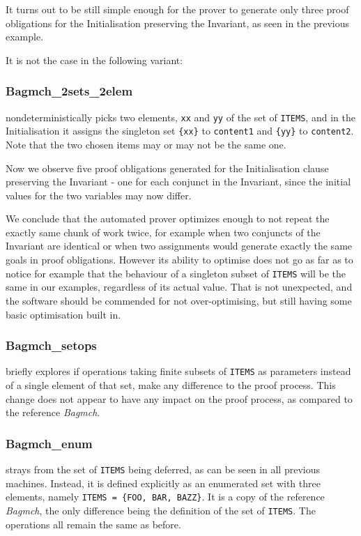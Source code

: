 \documentclass[11pt,journal]{IEEEtran}
\begin{document}
	It turns out to be still simple enough for the prover to generate only three proof obligations for the Initialisation preserving the Invariant, as seen in the previous example.
	
	It is not the case in the following variant:
	
	\subsubsection{Bagmch\_2sets\_2elem} nondeterministically picks two elements, \texttt{xx} and \texttt{yy} of the set of \texttt{ITEMS}, and in the Initialisation it assigns the singleton set \texttt{\{xx\}} to \texttt{content1} and \texttt{\{yy\}} to \texttt{content2}. Note that the two chosen items may or may not be the same one. 
	
	Now we observe five proof obligations generated for the Initialisation clause preserving the Invariant - one for each conjunct in the Invariant, since the initial values for the two variables may now differ.
	
	We conclude that the automated prover optimizes enough to not repeat the exactly same chunk of work twice, for example when two conjuncts of the Invariant are identical or when two assignments would generate exactly the same goals in proof obligations. However its ability to optimise does not go as far as to notice for example that the behaviour of a singleton subset of \texttt{ITEMS} will be the same in our examples, regardless of its actual value. That is not unexpected, and the software should be commended for not over-optimising, but still having some basic optimisation built in.
	
	\subsubsection{Bagmch\_setops} briefly explores if operations taking finite subsets of \texttt{ITEMS} as parameters instead of a single element of that set, make any difference to the proof process. This change does not appear to have any impact on the proof process, as compared to the reference \emph{Bagmch}.
	
	\subsubsection{Bagmch\_enum} strays from the set of \texttt{ITEMS} being deferred, as can be seen in all previous machines. Instead, it is defined explicitly as an enumerated set with three elements, namely \texttt{ITEMS = \{FOO, BAR, BAZZ\}}. It is a copy of the reference \emph{Bagmch}, the only difference being the definition of the set of \texttt{ITEMS}. The operations all remain the same as before.
	
\end{document}
